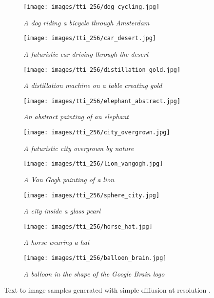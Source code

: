 \documentclass[nohyperref]{article}
\theoremstyle{plain}
\theoremstyle{definition}
\theoremstyle{remark}
\begin{document}
\begin{figure*}
\centering
\begin{subfigure}[t]{0.33\textwidth}
\centering
\texttt{[image: images/tti\_256/dog\_cycling.jpg]}
\caption{\textit{A dog riding a bicycle through Amsterdam}}
\end{subfigure} \hfill
\begin{subfigure}[t]{0.33\textwidth}
\centering
\texttt{[image: images/tti\_256/car\_desert.jpg]}
\caption{\textit{A futuristic car driving through the desert}}
 \end{subfigure} \hfill
\begin{subfigure}[t]{0.33\textwidth}
\centering
\texttt{[image: images/tti\_256/distillation\_gold.jpg]}
\caption{\textit{A distillation machine on a table creating gold}}
\end{subfigure} \hfill
\begin{subfigure}[t]{0.33\textwidth}
\texttt{[image: images/tti\_256/elephant\_abstract.jpg]}
\caption{\textit{An abstract painting of an elephant}}
\end{subfigure} \hfill
\begin{subfigure}[t]{0.33\textwidth}
\centering
\texttt{[image: images/tti\_256/city\_overgrown.jpg]}
\caption{\textit{A futuristic city overgrown by nature}}
\end{subfigure} \hfill
\begin{subfigure}[t]{0.33\textwidth}
\centering
\texttt{[image: images/tti\_256/lion\_vangogh.jpg]}
\caption{\textit{A Van Gogh painting of a lion}}
\end{subfigure}
\begin{subfigure}[t]{0.33\textwidth}
\centering
\texttt{[image: images/tti\_256/sphere\_city.jpg]}
\caption{\textit{A city inside a glass pearl}}
\end{subfigure} \hfill
\begin{subfigure}[t]{0.33\textwidth}
\centering
\texttt{[image: images/tti\_256/horse\_hat.jpg]}
\caption{\textit{A horse wearing a hat}}
\end{subfigure} \hfill
\begin{subfigure}[t]{0.33\textwidth}
\centering
\texttt{[image: images/tti\_256/balloon\_brain.jpg]}
\caption{\textit{A balloon in the shape of the Google Brain logo}}
\end{subfigure}
\caption{Text to image samples generated with simple diffusion at resolution .}
\end{figure*}
\end{document}
